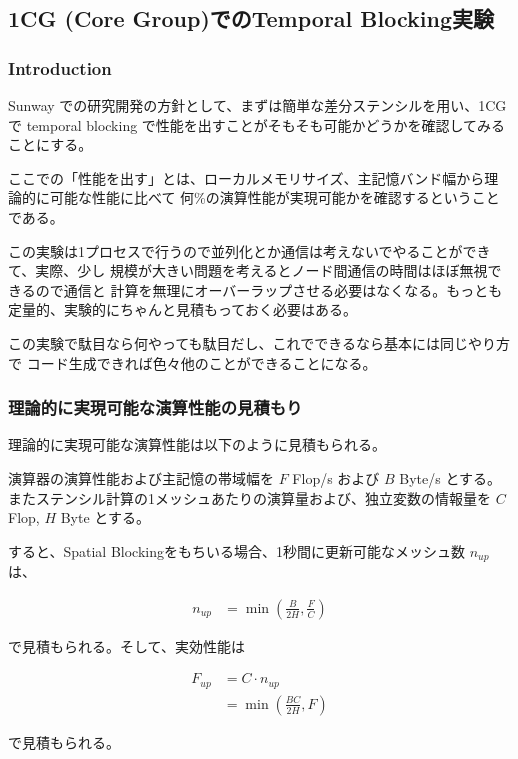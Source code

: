 \subsection{1CG (Core Group)でのTemporal Blocking実験}
\subsubsection{Introduction}

Sunway での研究開発の方針として、まずは簡単な差分ステンシルを用い、1CGで
temporal blocking で性能を出すことがそもそも可能かどうかを確認してみることにする。

ここでの「性能を出す」とは、ローカルメモリサイズ、主記憶バンド幅から理論的に可能な性能に比べて
何\%の演算性能が実現可能かを確認するということである。


この実験は1プロセスで行うので並列化とか通信は考えないでやることができて、実際、少し
規模が大きい問題を考えるとノード間通信の時間はほぼ無視できるので通信と
計算を無理にオーバーラップさせる必要はなくなる。もっとも
定量的、実験的にちゃんと見積もっておく必要はある。



この実験で駄目なら何やっても駄目だし、これでできるなら基本には同じやり方で
コード生成できれば色々他のことができることになる。


\subsubsection{理論的に実現可能な演算性能の見積もり}

理論的に実現可能な演算性能は以下のように見積もられる。

演算器の演算性能および主記憶の帯域幅を
$F$ Flop/s および
$B$ Byte/s とする。またステンシル計算の1メッシュあたりの演算量および、独立変数の情報量を
$C$ Flop, $H$ Byte とする。

すると、Spatial Blockingをもちいる場合、1秒間に更新可能なメッシュ数
$n_{up}$は、

\begin{align}
n_{up} &= \min \left( \frac{B}{2H}, \frac{F}{C} \right)
\end{align}

で見積もられる。そして、実効性能は

\begin{align}
  F_{up} &= C \cdot n_{up} \\
  &= \min \left( \frac{BC}{2H}, F \right)
\end{align}

で見積もられる。


